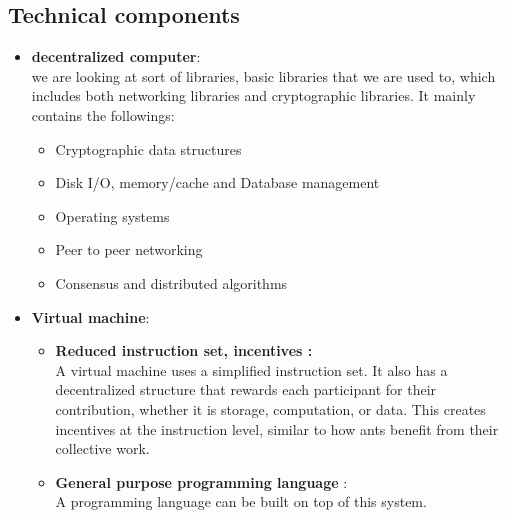 \subsection*{Technical components}
\begin{itemize}
	\item \textbf{decentralized computer}:\\
	we are looking at sort of libraries, basic libraries that we are used to, which includes both networking libraries and cryptographic libraries. It mainly contains the followings:
	\begin{itemize}
		\item Cryptographic data structures
		\item Disk I/O, memory/cache and Database management
		\item Operating systems 
		\item Peer to peer networking
		\item Consensus and distributed algorithms
	\end{itemize}
	\item \textbf{Virtual machine}:
	\begin{itemize}
		\item \textbf{Reduced instruction set, incentives :} \\
		A virtual machine uses a simplified instruction set. It also has a decentralized structure that rewards each participant for their contribution, whether it is storage, computation, or data. This creates incentives at the instruction level, similar to how ants benefit from their collective work.
		\item \textbf{General purpose programming language} : \\
		A programming language can be built on top of this system.
	\end{itemize}
\end{itemize}
